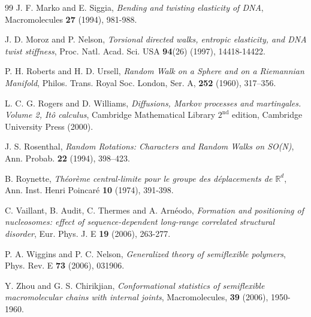 \documentclass[a4paper,reqno,11pt]{amsart}
\numberwithin{equation}{section}
\newcommand{\R}{\mathbb{R}}
\begin{document}
\begin{thebibliography}{99}
J. F. Marko and E. 
Siggia, \emph{Bending and twisting elasticity of DNA},
Macromolecules  {\bf  27} (1994), 981-988.

J. D. Moroz and P. Nelson,
\emph{
Torsional directed walks, entropic elasticity, and DNA twist stiffness},
Proc. Natl. Acad. Sci. USA {\bf 94}(26) (1997), 14418-14422.



 P. H. Roberts and H. D. Ursell,
\textit{Random Walk on a Sphere and on a Riemannian Manifold},
Philos. Trans. Royal Soc. London, Ser. A, {\bf 252} (1960), 317--356.

L. C. G. Rogers and D. Williams,
\emph{Diffusions, Markov processes and martingales.
Volume 2, It\^o calculus},
Cambridge Mathematical Library
$2^{\textrm{nd}}$ edition, Cambridge University Press (2000).



 J. S. Rosenthal,
\textit{Random Rotations: Characters and Random Walks on SO(N)},
Ann. Probab. {\bf 22} (1994), 398--423.

B. Roynette, \emph{Th\'eor\`eme central-limite pour le groupe des
d\'eplacements de $\R^d$}, Ann. Inst. Henri Poincar\'e {\bf 10} (1974), 391-398.


C. Vaillant,  B. Audit, C. Thermes and A. Arn\'eodo, 
\emph{Formation and positioning of nucleosomes: effect of sequence-dependent long-range correlated structural disorder}, 
Eur. Phys. J. E {\bf 19} (2006), 263-277. 

P. A. Wiggins and P. C. Nelson,
\emph{Generalized theory of semiflexible polymers},  Phys. Rev.  E {\bf 73} (2006), 031906.

Y. Zhou and G. S. Chirikjian,
\emph{Conformational statistics of semiflexible macromolecular chains with internal joints},
Macromolecules, {\bf 39} (2006), 1950-1960.








\end{thebibliography}
\end{document}
